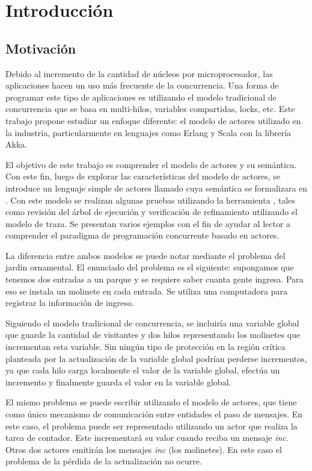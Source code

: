 \chapter{Introducción}

\section{Motivación}

Debido al incremento de la cantidad de núcleos por microprocesador, las aplicaciones hacen un uso más frecuente de la concurrencia. Una forma de programar este tipo de aplicaciones es utilizando el modelo tradicional de concurrencia que se basa en multi-hilos, variables compartidas, locks, etc. Este trabajo propone estudiar un enfoque diferente: el modelo de actores utilizado en la industria, particularmente en lenguajes como Erlang\cite{Cesarini:2009:EP:1717841, Armstrong:1996:CPE:229883} y Scala\cite{scala-overview-tech-report} con la librería Akka\cite{Wyatt:2013:AC:2663429}. 

El objetivo de este trabajo es comprender el modelo de actores y su semántica. Con este fin, luego de explorar las características del modelo de actores, se introduce un lenguaje simple de actores llamado \SAL cuya semántica se formalizara en \CSP. Con este modelo se realizan algunas pruebas utilizando la herramienta \FDR, tales como revisión del árbol de ejecución y verificación de refinamiento utilizando el modelo de traza. Se presentan varios ejemplos con el fin de ayudar al lector a comprender el paradigma de programación concurrente basado en actores.

La diferencia entre ambos modelos se puede notar mediante el problema del jardín ornamental. El enunciado del problema es el siguiente: supongamos que tenemos dos entradas a un parque y se requiere saber cuanta gente ingresa. Para eso se instala un molinete en cada entrada. Se utiliza una computadora para registrar la información de ingreso.

Siguiendo el modelo tradicional de concurrencia, se incluiría una variable global que guarde la cantidad de visitantes y dos hilos representando los molinetes que incrementan esta variable. Sin ningún tipo de protección en la región crítica planteada por la actualización de la variable global podrían perderse incrementos, ya que cada hilo carga localmente el valor de la variable global, efectúa un incremento y finalmente guarda el valor en la variable global. 

El mismo problema se puede escribir utilizando el modelo de actores, que tiene como único mecanismo de comunicación entre entidades el paso de mensajes. En este caso, el problema puede ser representado utilizando un actor que realiza la tarea de contador. Este incrementará su valor cuando reciba un mensaje \emph{inc}. Otros dos actores emitirán los mensajes \emph{inc} (los molinetes). En este caso el problema de la pérdida de la actualización no ocurre.

